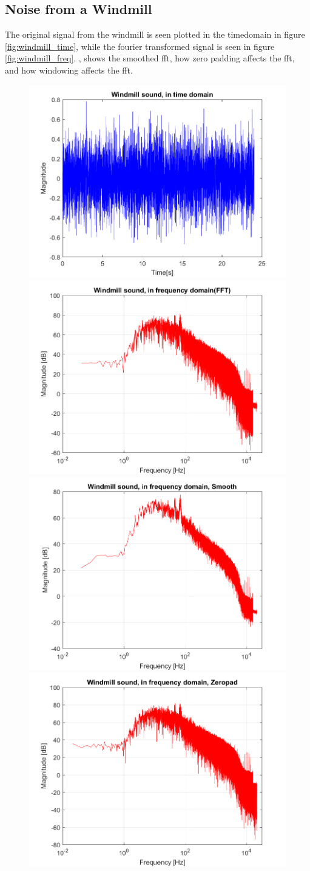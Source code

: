 \subsection{Noise from a Windmill}
The original signal from the windmill is seen plotted in the timedomain in figure \ref{fig:windmill_time}, while the fourier transformed signal is seen in figure \ref{fig:windmill_freq}.
, shows the smoothed fft, how zero padding affects the fft, and how windowing affects the fft.

\begin{figure}[htb!]
	\centering
	{\includegraphics[width=0.45\linewidth]{code/Windmill_figure1.png}}
	{\includegraphics[width=0.45\linewidth]{code/Windmill_figure2.png}}
	{\includegraphics[width=0.45\linewidth]{code/Windmill_figure3.png}}
	{\includegraphics[width=0.45\linewidth]{code/Windmill_figure4.png}}

\end{figure}
